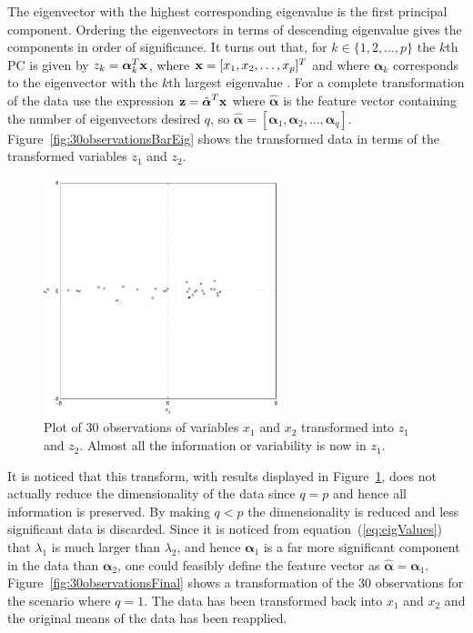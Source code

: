 The eigenvector with the highest corresponding eigenvalue is the first principal component. Ordering the eigenvectors in terms of descending eigenvalue gives the components in order of significance. It turns out that, for $k \in \{1, 2, \ldots, p\}$ the $k$th PC is given by $z_k = \boldsymbol\alpha_k^T\textrm{\textbf{x}}$, where $\textrm{\textbf{x}} = [x_1,x_2,\ldots, x_p]^T$ and where $\boldsymbol\alpha_k$ corresponds to the eigenvector with the $k$th largest eigenvalue \citep[p. 2-3]{Jolliffe1986}. For a complete transformation of the data use the expression $\textrm{\textbf{z}} = \hat{\boldsymbol\alpha}^T\textrm{\textbf{x}}$ where $\hat{\boldsymbol\alpha}$ is the feature vector containing the number of eigenvectors desired $q$, so $\hat{\boldsymbol\alpha} = [\boldsymbol\alpha_1,\boldsymbol\alpha_2,\ldots,\boldsymbol\alpha_q]$. Figure~\ref{fig:30observationsBarEig} shows the transformed data in terms of the transformed variables $z_1$ and $z_2$.

\begin{figure}[!]
  \begin{center}
    \includegraphics[width=260px]{30observationsBarTrans.pdf}
    \caption{Plot of 30 observations of variables $x_1$ and $x_2$ transformed into $z_1$ and $z_2$. Almost all the information or variability is now in $z_1$.}\label{fig:30observationsBarTrans}
  \end{center}
\end{figure}

It is noticed that this transform, with results displayed in Figure~\ref{fig:30observationsBarTrans}, does not actually reduce the dimensionality of the data since $q=p$ and hence all information is preserved. By making $q<p$ the dimensionality is reduced and less significant data is discarded. Since it is noticed from equation~(\ref{eq:eigValues}) that $\lambda_1$ is much larger than $\lambda_2$, and hence $\boldsymbol\alpha_1$ is a far more significant component in the data than $\boldsymbol\alpha_2$, one could feasibly define the feature vector as $\hat{\boldsymbol\alpha} = \boldsymbol\alpha_1$. Figure~\ref{fig:30observationsFinal} shows a transformation of the 30 observations for the scenario where $q=1$. The data has been transformed back into $x_1$ and $x_2$ and the original means of the data has been reapplied.

